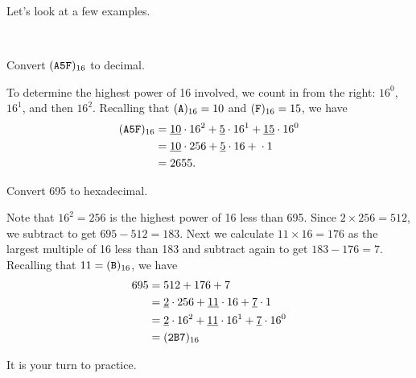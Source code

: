 Let's look at a few examples.

\begin{exam}
\label{exam_hex_decimal}
~
    \begin{apart}
        \item Convert $(\texttt{A5F})_{16}$ to decimal.
            \begin{soln}
                To determine the highest power of 16 involved, we count in from the right: $16^0$, $16^1$, and then $16^2$.  Recalling that $(\texttt{A})_{16}=10$ and $(\texttt{F})_{16}=15$, we have
                    \begin{align*}
                        (\texttt{A5F})_{16} &= \underline{10}\cdot 16^2 + \underline{5}\cdot 16^1 + \underline{15} \cdot 16^0 \\
                        & = \underline{10} \cdot 256 + \underline{5} \cdot 16 + \underline{} \cdot 1 \\
                        & =  2655.
                    \end{align*}
            \end{soln}
        \item Convert 695 to hexadecimal.
            \begin{soln}
                Note that $16^2 = 256$ is the highest power of 16 less than 695.  Since $2 \times 256 = 512$, we subtract to get $695 - 512 = 183$.  Next we calculate $11 \times 16 = 176$ as the largest multiple of 16 less than 183 and subtract again to get $183-176=7$.  Recalling that $11=(\texttt{B})_{16}$, we have
                    \begin{align*}
                        695 & = 512 + 176 + 7 \\
                        & = \underline{2} \cdot 256 + \underline{11} \cdot 16 + \underline{7} \cdot 1 \\
                        & = \underline{2}\cdot 16^2 + \underline{11}\cdot 16^1 + \underline{7} \cdot 16^0 \\
                        & =(\texttt{2B7})_{16}
                    \end{align*}
            \end{soln}
    \end{apart}
\end{exam}

It is your turn to practice.

